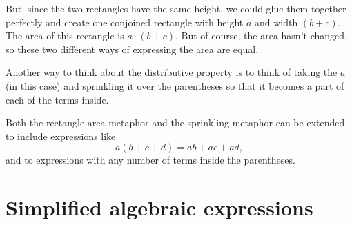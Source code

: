 But, since the two rectangles have the same height, we could glue them together perfectly and create one conjoined rectangle with height $a$ and width $(b+c)$. The area of this rectangle is $a \cdot (b+c)$. But of course, the area hasn't changed, so these two different ways of expressing the area are equal.

\begin{center}
\end{center}
Another way to think about the distributive property is to think of taking the $a$ (in this case) and sprinkling it over the parentheses so that it becomes a part of each of the terms inside.
\begin{center}
\end{center}
Both the rectangle-area metaphor and the sprinkling metaphor can be extended to include expressions like \[a(b+c+d) = ab + ac + ad,\] and to expressions with any number of terms inside the parentheses.

\section{Simplified algebraic expressions}
\label{sec:simpalgexpr}

